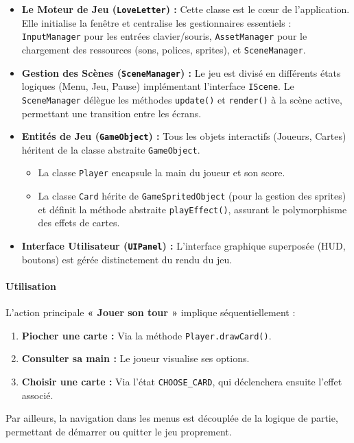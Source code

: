 \documentclass[paper=a4,fontsize=12pt,titlepage]{scrartcl}
\begin{document}
    \begin{itemize}
        \item \textbf{Le Moteur de Jeu (\texttt{LoveLetter}) :} Cette classe est le cœur de l'application.
        Elle initialise la fenêtre et centralise les gestionnaires essentiels : \texttt{InputManager} pour les entrées clavier/souris, \texttt{AssetManager}
        pour le chargement des ressources (sons, polices, sprites), et \texttt{SceneManager}.

        \item \textbf{Gestion des Scènes (\texttt{SceneManager}) :} Le jeu est divisé en différents
        états logiques (Menu, Jeu, Pause) implémentant l'interface \texttt{IScene}. Le \texttt{SceneManager}
        délègue les méthodes \texttt{update()} et \texttt{render()} à la scène active, permettant une transition entre les écrans.

        \item \textbf{Entités de Jeu (\texttt{GameObject}) :} Tous les objets interactifs (Joueurs, Cartes)
        héritent de la classe abstraite \texttt{GameObject}.
        \begin{itemize}
            \item La classe \texttt{Player} encapsule la main du joueur et son score.
            \item La classe \texttt{Card} hérite de \texttt{GameSpritedObject} (pour la gestion des sprites)
            et définit la méthode abstraite \texttt{playEffect()}, assurant le polymorphisme des effets de cartes.
        \end{itemize}

        \item \textbf{Interface Utilisateur (\texttt{UIPanel}) :} L'interface graphique superposée
        (HUD, boutons) est gérée distinctement du rendu du jeu.
    \end{itemize}

    \paragraph{Utilisation} L'action principale \textbf{« Jouer son tour »} implique séquentiellement :
    \begin{enumerate}
        \item \textbf{Piocher une carte :} Via la méthode \texttt{Player.drawCard()}.
        \item \textbf{Consulter sa main :} Le joueur visualise ses options.
        \item \textbf{Choisir une carte :} Via l'état \verb|CHOOSE_CARD|, qui déclenchera
        ensuite l'effet associé.
    \end{enumerate}
    Par ailleurs, la navigation dans les menus est découplée de la logique de partie,
    permettant de démarrer ou quitter le jeu proprement.
\end{document}
